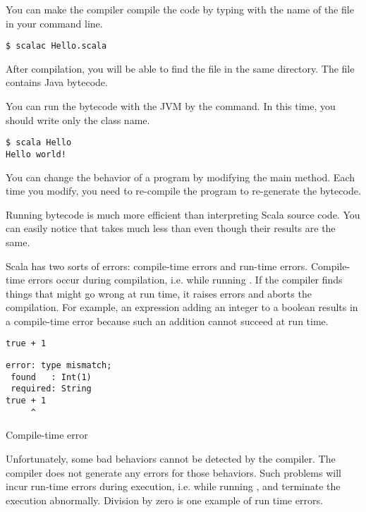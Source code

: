 You can make the compiler compile the code by typing  with the name
of the file in your command line.

\begin{verbatim}
$ scalac Hello.scala
\end{verbatim}

After compilation, you will be able to find the  file
in the same directory. The file contains Java bytecode.

You can run the bytecode with the JVM by the  command. In this time,
you should write only the class name.

\begin{verbatim}
$ scala Hello
Hello world!
\end{verbatim}

You can change the behavior of a program by modifying the main method.
Each time you modify, you need to re-compile the program to re-generate the
bytecode.

Running bytecode is much more efficient than interpreting Scala source code.
You can easily notice that  takes much less than  even though their results are the same.

Scala has two sorts of errors: compile-time errors and run-time errors.
Compile-time errors occur during compilation, i.e. while running .
If the compiler finds things that
might go wrong at run time, it raises errors and aborts the compilation. For
example, an expression adding an integer to a boolean results in a compile-time
error because such an addition cannot succeed at run time.

\begin{verbatim}
true + 1
\end{verbatim}
\vspace{-1em}
\begin{mdframed}[hidealllines=true,backgroundcolor=red!10,innerleftmargin=3pt,innerrightmargin=3pt,leftmargin=-3pt,rightmargin=-3pt]
\begin{verbatim}
error: type mismatch;
 found   : Int(1)
 required: String
true + 1
     ^
\end{verbatim}
\vspace{-2em}
\begin{flushright}
\scriptsize\textsf{Compile-time error}
\end{flushright}
\end{mdframed}

Unfortunately, some bad behaviors cannot be detected by the compiler.
The compiler does not generate any errors for those behaviors.
Such problems will incur run-time errors during execution, i.e. while running
,
and terminate the execution abnormally. Division by zero is one
example of run time errors.

